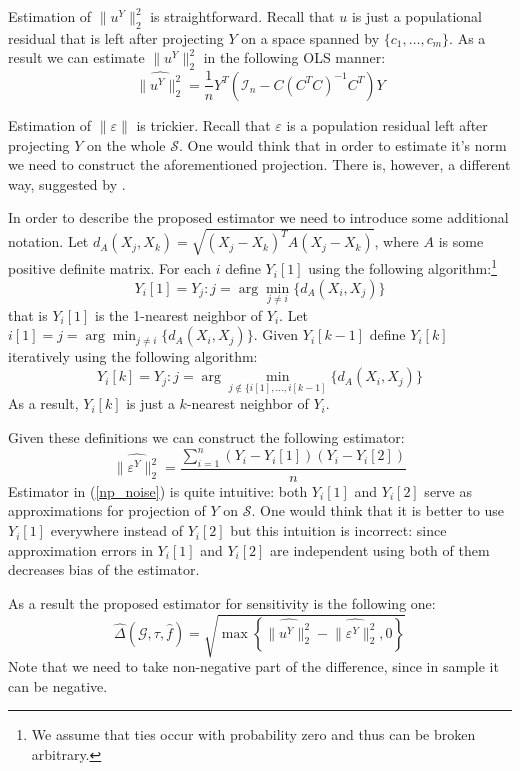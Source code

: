 \documentclass[12pt]{article}
\theoremstyle{plain}
\begin{document}
Estimation of $\|u^Y\|^2_2$ is straightforward. Recall that $u$ is just a populational residual that is left after projecting $Y$ on a space spanned by $\{c_1,\dots, c_m\}$. As a result we can estimate $\|u^Y\|_2^2$ in the following OLS manner:
\begin{equation}\label{p_noise}
\widehat{\|u^Y\|_2^2} = \frac 1n Y^T\left(\mathcal{I}_n - C\left(C^TC\right)^{-1}C^T\right)Y
\end{equation}

Estimation of $\|\varepsilon\|$ is trickier. Recall that $\varepsilon$ is a population residual left after projecting $Y$ on the whole $\mathcal{S}$. One would think that in order to estimate it's norm we need to construct the aforementioned projection. There is, however, a different way, suggested by \parencite{liitiainen2008nonparametric}.

In order to describe the proposed estimator we need to introduce some additional notation. Let $d_A(X_j, X_k) = \sqrt{ (X_j-X_k)^TA (X_j-X_k)}$, where $A$ is some positive definite matrix. For each $i$ define $Y_i[1]$ using the following algorithm:\footnote{We assume that ties occur with probability zero and thus can be broken arbitrary.}
\begin{equation}\label{1st_nn}
Y_i[1] = Y_j: j =\arg\min_{j\ne i} \{d_A(X_i, X_j)\}
\end{equation}
that is $Y_i[1]$ is the 1-nearest neighbor of $Y_i$. Let $i[1] = j = \arg\min_{j\ne i} \{d_A(X_i, X_j)\}$. Given $Y_i[k-1]$ define $Y_i[k]$ iteratively using the following algorithm:
\begin{equation}\label{kth_nn}
Y_i[k] = Y_j: j =\arg\min_{j\not\in\{i[1],\dots,i[k-1]} \{d_A(X_i, X_j)\}
\end{equation}
As a result, $Y_i[k]$ is just a $k$-nearest neighbor of $Y_i$.

Given these definitions we can construct the following estimator:
\begin{equation}\label{np_noise}
\widehat{\|\varepsilon^Y\|_2^2} = \frac{\sum_{i=1}^n(Y_i - Y_i[1])(Y_i-Y_i[2])}{n}
\end{equation}
Estimator in (\ref{np_noise}) is quite intuitive: both $Y_i[1]$ and $Y_i[2]$ serve as approximations for projection of $Y$ on $\mathcal{S}$. One would think that it is better to use $Y_i[1]$ everywhere instead of $Y_i[2]$ but this intuition is incorrect: since approximation errors in $Y_i[1]$ and $Y_i[2]$ are independent using both of them decreases bias of the estimator. 

As a result the proposed estimator for sensitivity is the following one:
\begin{equation}\label{diff_est}
\widehat {\Delta}(\mathcal{G},\tau,\hat f) = \sqrt{\max\left\{\widehat{\|u^Y\|_2^2} -\widehat{\|\varepsilon^Y\|_2^2},0\right\} }
\end{equation}
Note that we need to take non-negative part of the difference, since in sample it can be negative. 
\end{document}
